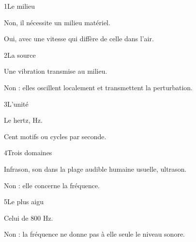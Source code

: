 \par\noindent\begin{minipage}{\linewidth}
\begin{corrige}{1}{Le milieu}
\begin{questions}
\item Non, il nécessite un milieu matériel.
\item Oui, avec une vitesse qui diffère de celle dans l’air.
\end{questions}
\end{corrige}
\end{minipage}
\par\noindent\begin{minipage}{\linewidth}
\begin{corrige}{2}{La source}
\begin{questions}
\item Une vibration transmise au milieu.
\item Non : elles oscillent localement et transmettent la perturbation.
\end{questions}
\end{corrige}
\end{minipage}
\par\noindent\begin{minipage}{\linewidth}
\begin{corrige}{3}{L’unité}
\begin{questions}
\item Le hertz, Hz.
\item Cent motifs ou cycles par seconde.
\end{questions}
\end{corrige}
\end{minipage}
\par\noindent\begin{minipage}{\linewidth}
\begin{corrige}{4}{Trois domaines}
\begin{questions}
\item Infrason, son dans la plage audible humaine usuelle, ultrason.
\item Non : elle concerne la fréquence.
\end{questions}
\end{corrige}
\end{minipage}
\par\noindent\begin{minipage}{\linewidth}
\begin{corrige}{5}{Le plus aigu}
\begin{questions}
\item Celui de 800 Hz.
\item Non : la fréquence ne donne pas à elle seule le niveau sonore.
\end{questions}
\end{corrige}
\end{minipage}
